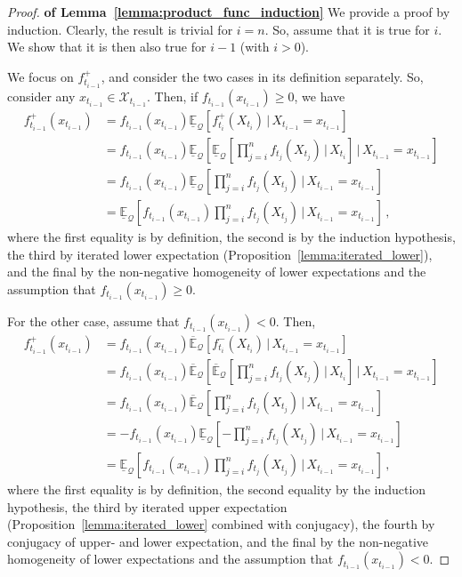 \documentclass[3p]{elsarticle}
\newcommand{\states}{\mathcal{X}}
\newcommand{\rateset}{\mathcal{Q}}
\begin{document}
\begin{proof}{\bf of Lemma~\ref{lemma:product_func_induction}}
We provide a proof by induction. Clearly, the result is trivial for $i=n$. So, assume that it is true for $i$. We show that it is then also true for $i-1$ (with $i>0$).

We focus on $f_{t_{i-1}}^+$, and consider the two cases in its definition separately. So, consider any $x_{t_{i-1}}\in\states_{t_{i-1}}$. Then, if $f_{t_{i-1}}(x_{t_{i-1}})\geq 0$, we have
\begin{align*}
f_{t_{i-1}}^+(x_{t_{i-1}}) &= f_{t_{i-1}}(x_{t_{i-1}}) \underline{\mathbb{E}}_{\rateset}\left[f_{t_{i}}^+(X_{t_{i}})\,\vert\,X_{t_{i-1}}=x_{t_{i-1}}\right] \\
 &= f_{t_{i-1}}(x_{t_{i-1}})\underline{\mathbb{E}}_{\rateset}\left[\underline{\mathbb{E}}_{\rateset}\left[\prod_{j=i}^{n}f_{t_j}(X_{t_j})\,\Bigg\vert\,X_{t_i}\right]\,\Bigg\vert\,X_{t_{i-1}}=x_{t_{i-1}}\right] \\
 &= f_{t_{i-1}}(x_{t_{i-1}})\underline{\mathbb{E}}_{\rateset}\left[\prod_{j=i}^{n}f_{t_j}(X_{t_j})\,\Bigg\vert\,X_{t_{i-1}}=x_{t_{i-1}}\right] \\ 
 &= \underline{\mathbb{E}}_{\rateset}\left[f_{t_{i-1}}(x_{t_{i-1}})\prod_{j=i}^{n}f_{t_j}(X_{t_j})\,\Bigg\vert\,X_{t_{i-1}}=x_{t_{i-1}}\right]\,,
\end{align*}
where the first equality is by definition, the second is by the induction hypothesis, the third by iterated lower expectation (Proposition~\ref{lemma:iterated_lower}), and the final by the non-negative homogeneity of lower expectations and the assumption that $f_{t_{i-1}}(x_{t_{i-1}})\geq 0$.

For the other case, assume that $f_{t_{i-1}}(x_{t_{i-1}})< 0$. Then,
\begin{align*}
f_{t_{i-1}}^+(x_{t_{i-1}}) &= f_{t_{i-1}}(x_{t_{i-1}})\overline{\mathbb{E}}_{\rateset}\left[f_{t_{i}}^-(X_{t_{i}})\,\vert\,X_{t_{i-1}}=x_{t_{i-1}}\right] \\
&= f_{t_{i-1}}(x_{t_{i-1}})\overline{\mathbb{E}}_{\rateset}\left[ \overline{\mathbb{E}}_{\rateset}\left[\prod_{j=i}^{n}f_{t_j}(X_{t_j})\,\Bigg\vert\,X_{t_i}\right]\,\Bigg\vert\,X_{t_{i-1}}=x_{t_{i-1}}\right] \\
&= f_{t_{i-1}}(x_{t_{i-1}})\overline{\mathbb{E}}_{\rateset}\left[\prod_{j=i}^{n}f_{t_j}(X_{t_j})\,\Bigg\vert\,X_{t_{i-1}}=x_{t_{i-1}}\right] \\
&= -f_{t_{i-1}}(x_{t_{i-1}})\underline{\mathbb{E}}_{\rateset}\left[-\prod_{j=i}^{n}f_{t_j}(X_{t_j})\,\Bigg\vert\,X_{t_{i-1}}=x_{t_{i-1}}\right] \\
&= \underline{\mathbb{E}}_{\rateset}\left[f_{t_{i-1}}(x_{t_{i-1}})\prod_{j=i}^{n}f_{t_j}(X_{t_j})\,\Bigg\vert\,X_{t_{i-1}}=x_{t_{i-1}}\right]\,,
\end{align*}
where the first equality is by definition, the second equality by the induction hypothesis, the third by iterated upper expectation (Proposition~\ref{lemma:iterated_lower} combined with conjugacy), the fourth by conjugacy of upper- and lower expectation, and the final by the non-negative homogeneity of lower expectations and the assumption that $f_{t_{i-1}}(x_{t_{i-1}})<0$.


\end{proof}
\end{document}
